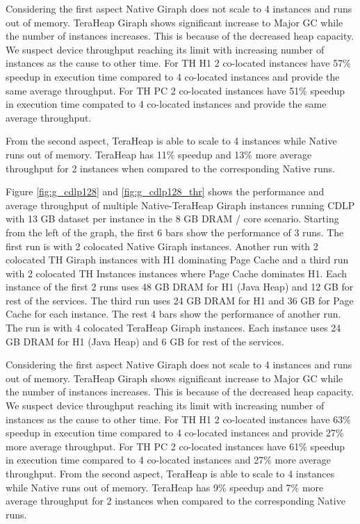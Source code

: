 Considering the first aspect Native Giraph does not scale to 4 instances and runs out of memory. TeraHeap Giraph shows significant increase to Major GC while the number of instances increases. This is because of the decreased heap capacity. We suspect device throughput reaching its limit with increasing number of instances as the cause to other time. For TH H1 2 co-located instances have 57\% speedup in execution time compared to 4 co-located instances and provide the same average throughput. For TH PC 2 co-located instances have 51\% speedup in execution time compated to 4 co-located instances and provide the same average throughput.

From the second aspect, TeraHeap is able to scale to 4 instances while Native runs out of memory. TeraHeap has 11\% speedup and 13\% more average throughput for 2 instances when compared to the corresponding Native runs.

Figure \ref{fig:g_cdlp128} and \ref{fig:g_cdlp128_thr} shows the performance and average throughput of multiple
Native-TeraHeap Giraph instances running CDLP with 13 GB
dataset per instance in the 8 GB DRAM / core scenario.
Starting from the left of the graph, the first 6 bars show the
performance of 3 runs. The first run is with 2 colocated Native Giraph instances.
Another run with 2 colocated TH Giraph instances with H1 dominating Page Cache
and a third run with 2 colocated TH Instances instances where Page Cache dominates H1.
Each instance of the first 2 runs uses 48 GB DRAM for H1 (Java Heap) and 12 GB for rest of the services.
The third run uses 24 GB DRAM for H1 and 36 GB for Page Cache for each instance.
The rest 4 bars show the performance of another run. The run is with 4 colocated TeraHeap Giraph instances.
Each instance uses 24 GB DRAM for H1 (Java Heap) and 6 GB for rest of the services.

Considering the first aspect Native Giraph does not scale to 4 instances and runs out of memory. TeraHeap Giraph shows significant increase to Major GC while the number of instances increases. This is because of the decreased heap capacity. We suspect device throughput reaching its limit with increasing number of instances as the cause to other time. For TH H1 2 co-located instances have 63\% speedup in execution time compared to 4 co-located instances and provide 27\% more average throughput. For TH PC 2 co-located instances have 61\% speedup in execution time compared to 4 co-located instances and 27\% more average throughput. From the second aspect, TeraHeap is able to scale to 4 instances while Native runs out of memory. TeraHeap has 9\% speedup and 7\% more average throughput for 2 instances when compared to the corresponding Native runs.

